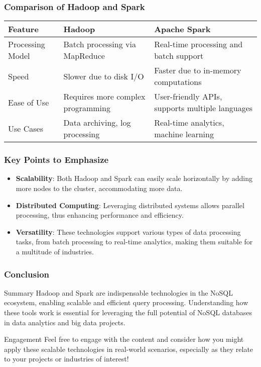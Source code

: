 \documentclass[aspectratio=169]{beamer}
\begin{document}
\begin{frame}[fragile]
    \frametitle{Comparison of Hadoop and Spark}
    \begin{table}[ht]
        \centering
        \begin{tabular}{|l|l|l|}
            \hline
            \textbf{Feature} & \textbf{Hadoop} & \textbf{Apache Spark} \\
            \hline
            Processing Model & Batch processing via MapReduce & Real-time processing and batch support \\
            \hline
            Speed & Slower due to disk I/O & Faster due to in-memory computations \\
            \hline
            Ease of Use & Requires more complex programming & User-friendly APIs, supports multiple languages \\
            \hline
            Use Cases & Data archiving, log processing & Real-time analytics, machine learning \\
            \hline
        \end{tabular}
    \end{table}
\end{frame}

\begin{frame}[fragile]
    \frametitle{Key Points to Emphasize}
    \begin{itemize}
        \item \textbf{Scalability}: Both Hadoop and Spark can easily scale horizontally by adding more nodes to the cluster, accommodating more data.
        \item \textbf{Distributed Computing}: Leveraging distributed systems allows parallel processing, thus enhancing performance and efficiency.
        \item \textbf{Versatility}: These technologies support various types of data processing tasks, from batch processing to real-time analytics, making them suitable for a multitude of industries.
    \end{itemize}
\end{frame}

\begin{frame}[fragile]
    \frametitle{Conclusion}
    \begin{block}{Summary}
        Hadoop and Spark are indispensable technologies in the NoSQL ecosystem, enabling scalable and efficient query processing. Understanding how these tools work is essential for leveraging the full potential of NoSQL databases in data analytics and big data projects.
    \end{block}
    \begin{block}{Engagement}
        Feel free to engage with the content and consider how you might apply these scalable technologies in real-world scenarios, especially as they relate to your projects or industries of interest!
    \end{block}
\end{frame}
\end{document}
